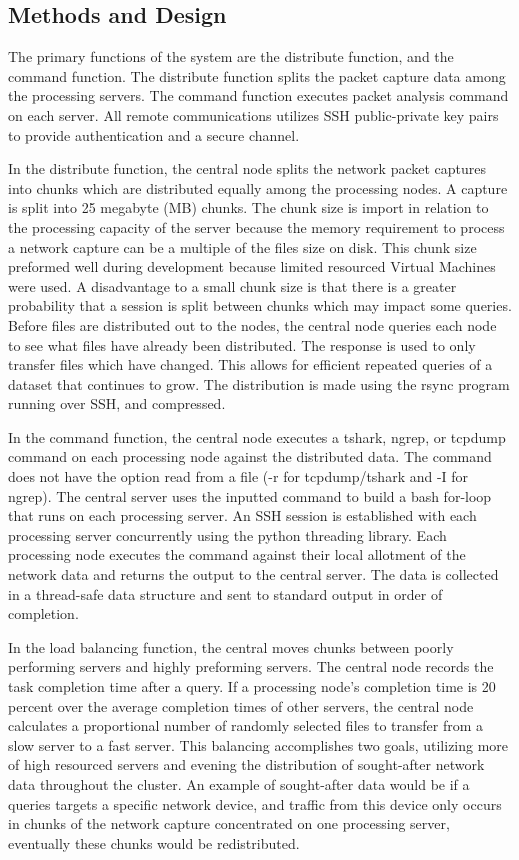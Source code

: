 \documentclass{article}
\begin{document}
\begin{multicols}{2}
\section{Methods and Design}

The primary functions of the system are the distribute function, and the command function. The distribute function splits the packet capture data among the processing servers. The command function executes packet analysis command on each server.  All remote communications utilizes SSH public-private key pairs to provide authentication and a secure channel.  

In the distribute function,  the central node splits the network packet captures into chunks which are distributed equally among the processing nodes.  A capture is split into 25 megabyte (MB) chunks. The chunk size is import in relation to the processing capacity of the server because the memory requirement to process a network capture can be a multiple of the files size on disk. This chunk size preformed well during development because limited resourced Virtual Machines were used.  A disadvantage to a small chunk size is that there is a greater probability that a session is split between chunks which may impact some queries.  Before files are distributed out to the nodes, the central node queries each node to see what files have already been distributed. The response is used to only transfer files which have changed.  This allows for efficient repeated queries of a dataset that continues to grow. The distribution is made using the rsync program running over SSH, and compressed.     

In the command function, the central node executes a tshark, ngrep, or tcpdump command on each processing node against the distributed data.  The command does not have the option read from a file (-r for tcpdump/tshark and -I for ngrep).  The central server uses the inputted command to build a bash for-loop that runs on each processing server. An SSH session is established with each processing server concurrently using the python threading library.  Each processing node executes the command against their local allotment of the network data and returns the output to the central server. The data is collected in a thread-safe data structure and sent to standard output in order of completion.

In the load balancing function, the central moves chunks between poorly performing servers and highly preforming servers.  The central node records the task completion time after a query.  If a processing node's completion time is 20 percent over the average completion times of other servers, the central node calculates a proportional number of randomly selected files to transfer from a slow server to a fast server.  This balancing accomplishes two goals, utilizing more of high resourced servers and evening the distribution of sought-after network data throughout the cluster.  An example of sought-after data would be if a queries targets a specific network device, and traffic from this device only occurs in chunks of the network capture concentrated on one processing server, eventually these chunks would be redistributed. 


\end{multicols}
\end{document}
